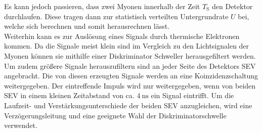 Es kann jedoch passieren, dass zwei Myonen innerhalb der Zeit $T_\text{S}$ den Detektor durchlaufen.
Diese tragen dann zur statistisch verteilten Untergrundrate $U$ bei, welche sich berechnen und somit herausrechnen lässt. \\

Weiterhin kann es zur Auslösung eines Signals durch thermische Elektronen kommen.
Da die Signale meist klein sind im Vergleich zu den Lichtsignalen der Myonen können sie mithilfe einer Diskriminator Schweller herausgefiltert werden.
Um zudem größere Signale herauszufiltern sind an jeder Seite des Detektors SEV angebracht.
Die von diesen erzeugten Signale werden an eine Koinzidenzschaltung weitergegeben.
Der eintreffende Impuls wird nur weitergegeben, wenn von beiden SEV in einem kleinen Zeitabstand von ca. $\SI{4}{\nano\second}$ ein Signal eintrifft.
Um die Laufzeit- und Verstärkungsunterschiede der beiden SEV anzugleichen, wird eine Verzögerungsleitung und eine geeignete Wahl der Diskriminatorschwelle verwendet.
\FloatBarrier

